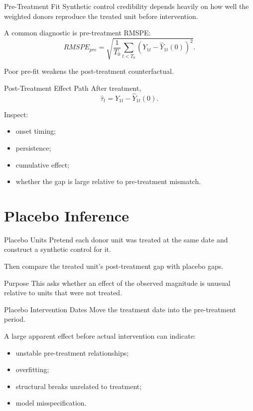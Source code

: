 \documentclass[aspectratio=169,11pt]{beamer}
\begin{document}
\begin{frame}{Pre-Treatment Fit}
Synthetic control credibility depends heavily on how well the weighted donors reproduce the treated unit before intervention.

A common diagnostic is pre-treatment RMSPE:
\[
RMSPE_{pre}
=
\sqrt{
\frac{1}{T_0}
\sum_{t<T_0}
(Y_{1t}-\widehat Y_{1t}(0))^2
}.
\]

Poor pre-fit weakens the post-treatment counterfactual.
\end{frame}

\begin{frame}{Post-Treatment Effect Path}
After treatment,
\[
\widehat\tau_t
=
Y_{1t}
-
\widehat Y_{1t}(0).
\]

Inspect:
\begin{itemize}
\item onset timing;
\item persistence;
\item cumulative effect;
\item whether the gap is large relative to pre-treatment mismatch.
\end{itemize}
\end{frame}

\section{Placebo Inference}

\begin{frame}{Placebo Units}
Pretend each donor unit was treated at the same date and construct a synthetic control for it.

Then compare the treated unit's post-treatment gap with placebo gaps.

\begin{block}{Purpose}
This asks whether an effect of the observed magnitude is unusual relative to units that were not treated.
\end{block}
\end{frame}

\begin{frame}{Placebo Intervention Dates}
Move the treatment date into the pre-treatment period.

A large apparent effect before actual intervention can indicate:
\begin{itemize}
\item unstable pre-treatment relationships;
\item overfitting;
\item structural breaks unrelated to treatment;
\item model misspecification.
\end{itemize}
\end{frame}
\end{document}
